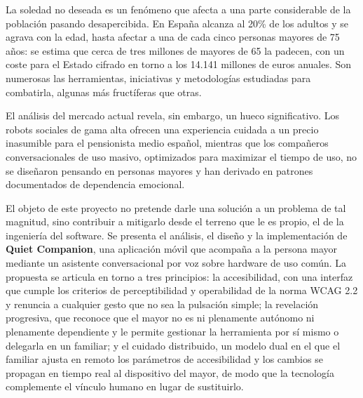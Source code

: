 \pagestyle{empty}

\chapter*{}

\thispagestyle{empty}

\begin{center}
{\large\bfseries \thetitle}\\
\end{center}
\begin{center}
\theauthor\\
\end{center}

\vspace{0.5cm}
\\

La soledad no deseada es un fenómeno que afecta a una parte considerable de la población pasando
desapercibida. En España alcanza al 20\% de los adultos y se agrava con la edad, hasta afectar a una de cada
cinco personas mayores de 75 años: se estima que cerca de tres millones de mayores de 65 la padecen, con un
coste para el Estado cifrado en torno a los 14.141 millones de euros anuales. Son numerosas las herramientas,
iniciativas y metodologías estudiadas para combatirla, algunas más fructíferas que otras.

El análisis del mercado actual revela, sin embargo, un hueco significativo. Los robots sociales de gama alta
ofrecen una experiencia cuidada a un precio inasumible para el pensionista medio español, mientras que los
compañeros conversacionales de uso masivo, optimizados para maximizar el tiempo de uso, no se diseñaron
pensando en personas mayores y han derivado en patrones documentados de dependencia emocional.

El objeto de este proyecto no pretende darle una solución a un problema de tal magnitud, sino contribuir a
mitigarlo desde el terreno que le es propio, el de la ingeniería del software. Se presenta el análisis, el
diseño y la implementación de \textbf{Quiet Companion}, una aplicación móvil que acompaña a la persona mayor
mediante un asistente conversacional por voz sobre hardware de uso común. La propuesta se articula
en torno a tres principios: la accesibilidad, con una interfaz que cumple los criterios de perceptibilidad y
operabilidad de la norma WCAG 2.2 y renuncia a cualquier gesto que no sea la pulsación simple; la revelación
progresiva, que reconoce que el mayor no es ni plenamente autónomo ni plenamente dependiente y le permite
gestionar la herramienta por sí mismo o delegarla en un familiar; y el cuidado distribuido, un modelo dual en
el que el familiar ajusta en remoto los parámetros de accesibilidad y los cambios se propagan en tiempo real
al dispositivo del mayor, de modo que la tecnología complemente el vínculo humano en lugar de sustituirlo.


